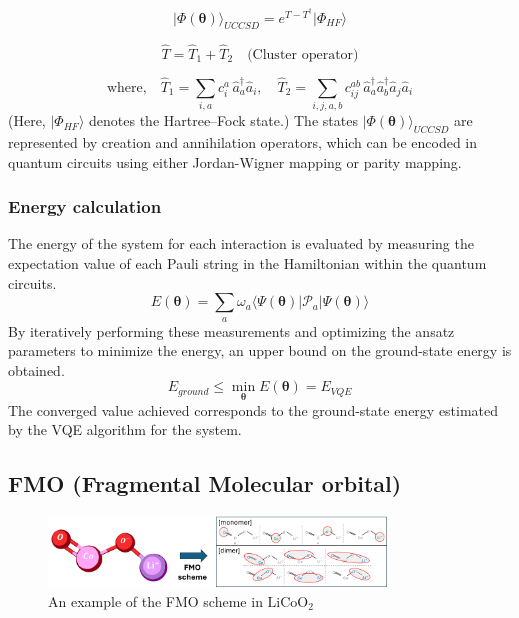 \documentclass[pdflatex,sn-mathphys-num]{sn-jnl}%
\theoremstyle{thmstyleone}%
\theoremstyle{thmstyletwo}%
\theoremstyle{thmstylethree}%
\begin{document}
\begin{equation}
\vert \Phi(\mathbf{\theta})\rangle_{UCCSD} = e^{T-T^{\dagger}}\vert \Phi_{HF} \rangle
\end{equation}

\begin{equation}
\hat{T} = \hat{T}_1 + \hat{T}_2 \quad \text{(Cluster operator)}
\end{equation}

\begin{equation*}
\text{where,} \quad 
\hat{T}_1 = \sum_{i,a} c_i^a \, \hat{a}_a^{\dagger} \hat{a}_i, \quad
\hat{T}_2 = \sum_{i,j,a,b} c_{ij}^{ab} \, \hat{a}_a^{\dagger} \hat{a}_b^{\dagger} \hat{a}_j \hat{a}_i
\end{equation*}
(Here, $\lvert \Phi_{HF} \rangle$ denotes the Hartree–Fock state.) The states $\vert \Phi(\mathbf{\theta})\rangle_{UCCSD}$ are represented by creation and annihilation operators, which can be encoded in quantum circuits using either Jordan-Wigner mapping or parity mapping. 

\subsubsection{Energy calculation}\label{subsec2.2.3}
The energy of the system for each interaction is evaluated by measuring the expectation value of each Pauli string in the Hamiltonian within the quantum circuits. 
\begin{equation}
E(\mathbf{\theta}) = \sum_{a} \omega_a \langle \Psi(\mathbf{\theta}) \vert \mathcal{P}_a \vert \Psi(\mathbf{\theta}) \rangle
\end{equation}
By iteratively performing these measurements and optimizing the ansatz parameters to minimize the energy, an upper bound on the ground-state energy is obtained. 
\begin{equation}
E_{ground}\leq \min_{\mathbf{\theta}} E(\mathbf{\theta}) = E_{VQE} 
\end{equation}
The converged  value achieved corresponds to the ground-state energy estimated by the VQE algorithm for the system.

\subsection{FMO (Fragmental Molecular orbital)}\label{subsec2.3}
\begin{figure}[H]
\centering
\includegraphics[width=0.8\textwidth]{fig/LiCoO2_FMO.png}
\caption{An example of the FMO scheme in \(\mathrm{LiCoO_2}\)}\label{Fig.4}
\end{figure}
\end{document}
